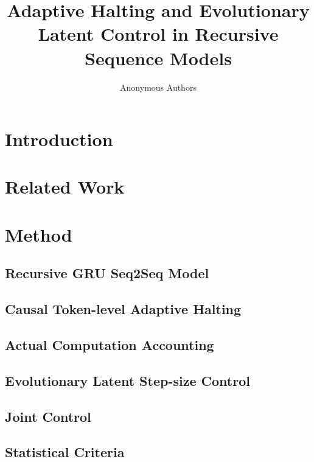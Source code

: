 \documentclass[11pt]{article}
\title{Adaptive Halting and Evolutionary Latent Control in Recursive Sequence Models}
\author{Anonymous Authors}
\begin{document}
\maketitle

\begin{abstract}
\end{abstract}

\section{Introduction}

\section{Related Work}

\section{Method}
\subsection{Recursive GRU Seq2Seq Model}
\subsection{Causal Token-level Adaptive Halting}
\subsection{Actual Computation Accounting}
\subsection{Evolutionary Latent Step-size Control}
\subsection{Joint Control}
\subsection{Statistical Criteria}
\end{document}
